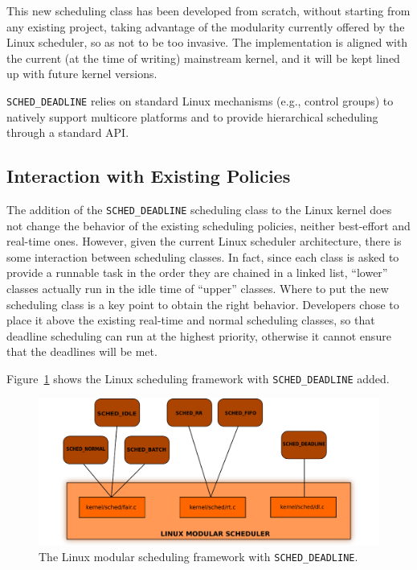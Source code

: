 This new scheduling class has been developed from scratch, without
starting from any existing project, taking advantage of the modularity
currently offered by the Linux scheduler, so as not to be too
invasive. The implementation is aligned with the current (at the time
of writing) mainstream kernel, and it will be kept lined up with
future kernel versions.

\texttt{SCHED\_DEADLINE} relies on standard Linux mechanisms (e.g.,
control groups) to natively support multicore platforms and to provide
hierarchical scheduling through a standard API.

\subsection{Interaction with Existing Policies}\label{sec:schedDead_interaction}

The addition of the \texttt{SCHED\_DEADLINE} scheduling class to the
Linux kernel does not change the behavior of the existing scheduling
policies, neither best-effort and real-time ones. However, given the
current Linux scheduler architecture, there is some interaction
between scheduling classes. In fact, since each class is asked to
provide a runnable task in the order they are chained in a linked
list, ``lower'' classes actually run in the idle time of ``upper''
classes. Where to put the new scheduling class is a key point to
obtain the right behavior. Developers chose to place it above the
existing real-time and normal scheduling classes, so that deadline
scheduling can run at the highest priority, otherwise it cannot ensure
that the deadlines will be met.  

Figure~\ref{fig:new_modular_scheduler} shows the Linux scheduling
framework with \texttt{SCHED\_DEADLINE} added.

\begin{figure}[htbp]
    \includegraphics[width=\columnwidth]{images/new_modular_scheduler}
    \caption{The Linux modular scheduling framework with
\texttt{SCHED\_DEADLINE}.}
    \label{fig:new_modular_scheduler}
\end{figure}

